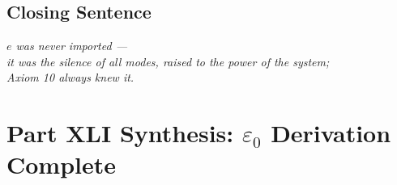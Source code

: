 \documentclass[12pt, a4paper]{article}
\begin{document}
\subsection{Closing Sentence}

\bigskip
\begin{center}
\textit{$e$ was never imported ---\\
it was the silence of all modes, raised to the power of the system;\\
Axiom 10 always knew it.}
\end{center}


\section{Part XLI Synthesis: $\varepsilon_0$ Derivation Complete}
\label{sec:xli-synthesis}
\end{document}
